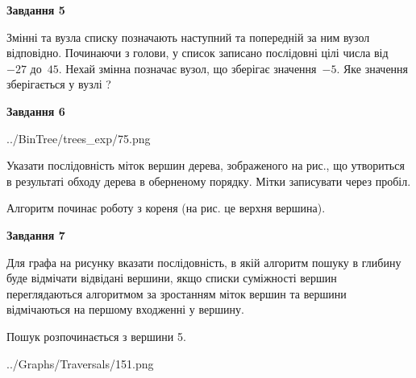 \documentclass[12pt, ukrainian]{article}
\begin{document}
{\begin {large}
{\begin {center}\textbf{Завдання 5}\end {center}}\par
Змінні  та  вузла списку позначають наступний та попередній за ним вузол відповідно. Починаючи з голови, у список записано послідовні цілі числа від~$-27$ до~$45$. Нехай змінна  позначає вузол, що зберігає значення~$-5$.
Яке значення зберігається у вузлі  ?\par
\newpage

{\begin {center}\textbf{Завдання 6}\end {center}}\par

\begin{center}
	{../BinTree/trees_exp/75.png}
\end{center}
Указати послідовність міток вершин дерева, зображеного на рис., що утвориться в результаті обходу дерева в оберненому порядку. Мітки записувати через пробіл.\par Алгоритм починає роботу з кореня (на рис. це верхня вершина).\par
\newpage

{\begin {center}\textbf{Завдання 7}\end {center}}\par
Для графа на рисунку вказати послідовність, в якій алгоритм пошуку в глибину буде відмічати відвідані вершини, якщо списки суміжності вершин переглядаються алгоритмом за зростанням міток вершин та вершини відмічаються на першому вход\-женні у вершину.\par
Пошук розпочинається з вершини 5.\par

\begin{center}
	{../Graphs/Traversals/151.png}
\end{center}\par
\newpage


\end{large}}
\end{document}
